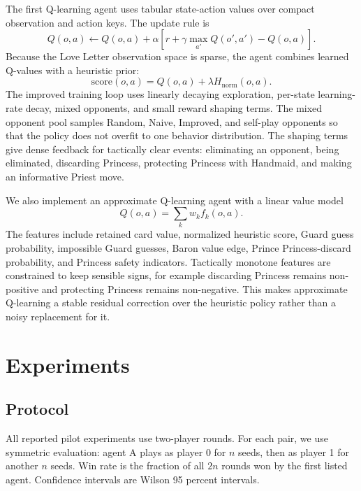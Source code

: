 \documentclass[10pt,twocolumn]{article}
\begin{document}
The first Q-learning agent uses tabular state-action values over compact
observation and action keys. The update rule is
\begin{equation}
Q(o,a) \leftarrow Q(o,a) +
\alpha\left[r + \gamma\max_{a'}Q(o',a') - Q(o,a)\right].
\end{equation}
Because the Love Letter observation space is sparse, the agent combines learned
Q-values with a heuristic prior:
\begin{equation}
\mathrm{score}(o,a) = Q(o,a) + \lambda H_{\mathrm{norm}}(o,a).
\end{equation}
The improved training loop uses linearly decaying exploration, per-state
learning-rate decay, mixed opponents, and small reward shaping terms. The
mixed opponent pool samples Random, Naive, Improved, and self-play opponents
so that the policy does not overfit to one behavior distribution. The shaping
terms give dense feedback for tactically clear events: eliminating an opponent,
being eliminated, discarding Princess, protecting Princess with Handmaid, and
making an informative Priest move.

We also implement an approximate Q-learning agent with a linear value model
\begin{equation}
Q(o,a) = \sum_k w_k f_k(o,a).
\end{equation}
The features include retained card value, normalized heuristic score, Guard
guess probability, impossible Guard guesses, Baron value edge, Prince
Princess-discard probability, and Princess safety indicators. Tactically
monotone features are constrained to keep sensible signs, for example
discarding Princess remains non-positive and protecting Princess remains
non-negative. This makes approximate Q-learning a stable residual correction
over the heuristic policy rather than a noisy replacement for it.

\section{Experiments}

\subsection{Protocol}

All reported pilot experiments use two-player rounds. For each pair, we use
symmetric evaluation: agent A plays as player 0 for $n$ seeds, then as player
1 for another $n$ seeds. Win rate is the fraction of all $2n$ rounds won by
the first listed agent. Confidence intervals are Wilson 95 percent intervals.
\end{document}
